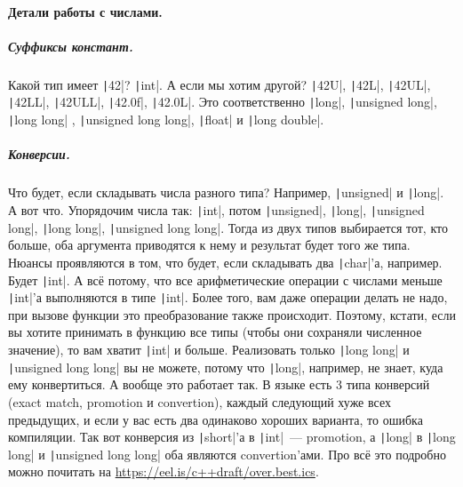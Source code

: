 \documentclass{article}
\begin{document}
    \paragraph{Детали работы с числами.}
    \subparagraph{Суффиксы констант.}
    Какой тип имеет \texttt|42|? \texttt|int|. А если мы хотим другой? \texttt|42U|, \texttt|42L|, \texttt|42UL|, \texttt|42LL|, \texttt|42ULL|, \texttt|42.0f|, \texttt|42.0L|. Это соответственно \texttt|long|, \texttt|unsigned long|, \texttt|long long| , \texttt|unsigned long long|, \texttt|float| и \texttt|long double|.
    \subparagraph{Конверсии.}
    Что будет, если складывать числа разного типа? Например, \texttt|unsigned| и \texttt|long|. А вот что. Упорядочим числа так: \texttt|int|, потом \texttt|unsigned|, \texttt|long|, \texttt|unsigned long|, \texttt|long long|, \texttt|unsigned long long|. Тогда из двух типов выбирается тот, кто больше, оба аргумента приводятся к нему и результат будет того же типа. Нюансы проявляются в том, что будет, если складывать два \texttt|char|'а, например. Будет \texttt|int|. А всё потому, что все арифметические операции с числами меньше \texttt|int|'а выполняются в типе \texttt|int|. Более того, вам даже операции делать не надо, при вызове функции это преобразование также происходит. Поэтому, кстати, если вы хотите принимать в функцию все типы (чтобы они сохраняли численное значение), то вам хватит \texttt|int| и больше. Реализовать только \texttt|long long| и \texttt|unsigned long long| вы не можете, потому что \texttt|long|, например, не знает, куда ему конвертиться. А вообще это работает так. В языке есть 3 типа конверсий (exact match, promotion и convertion), каждый следующий хуже всех предыдущих, и если у вас есть два одинаково хороших варианта, то ошибка компиляции. Так вот конверсия из \texttt|short|'а в \texttt|int|~--- promotion, а \texttt|long| в \texttt|long long| и \texttt|unsigned long long| оба являются convertion'ами. Про всё это подробно можно почитать на \url{https://eel.is/c++draft/over.best.ics}.
\end{document}
